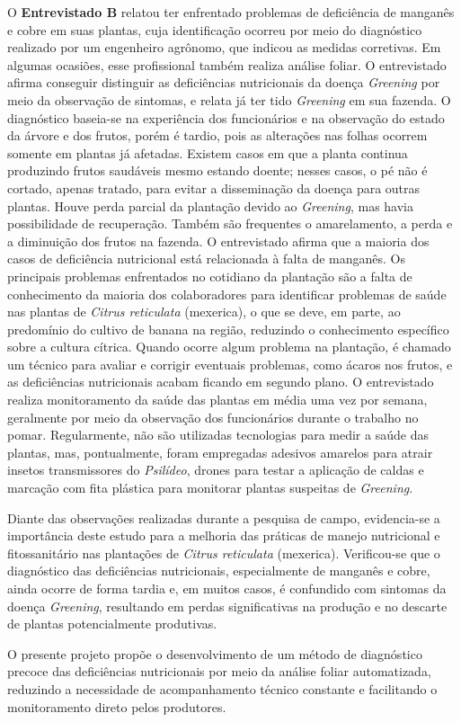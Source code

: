 O \textbf{Entrevistado B} relatou ter enfrentado problemas de deficiência de manganês e cobre 
em suas plantas, cuja identificação ocorreu por meio do diagnóstico realizado por um 
engenheiro agrônomo, que indicou as medidas corretivas. Em algumas ocasiões, esse profissional 
também realiza análise foliar. O entrevistado afirma conseguir distinguir as deficiências 
nutricionais da doença \textit{Greening} por meio da observação de sintomas, e relata já ter 
tido \textit{Greening} em sua fazenda. O diagnóstico baseia-se na experiência dos funcionários 
e na observação do estado da árvore e dos frutos, porém é tardio, pois as alterações nas 
folhas ocorrem somente em plantas já afetadas. Existem casos em que a planta continua 
produzindo frutos saudáveis mesmo estando doente; nesses casos, o pé não é cortado, apenas 
tratado, para evitar a disseminação da doença para outras plantas. Houve perda parcial da 
plantação devido ao \textit{Greening}, mas havia possibilidade de recuperação. 
Também são frequentes o amarelamento, a perda e a diminuição dos frutos na fazenda. 
O entrevistado afirma que a maioria dos casos de deficiência nutricional está relacionada 
à falta de manganês. Os principais problemas enfrentados no cotidiano da plantação são a 
falta de conhecimento da maioria dos colaboradores para identificar problemas de saúde nas 
plantas de \textit{Citrus reticulata} (mexerica), o que se deve, em parte, ao predomínio do 
cultivo de banana na região, reduzindo o conhecimento específico sobre a cultura cítrica. 
Quando ocorre algum problema na plantação, é chamado um técnico para avaliar e corrigir 
eventuais problemas, como ácaros nos frutos, e as deficiências nutricionais acabam ficando 
em segundo plano. O entrevistado realiza monitoramento da saúde das plantas em média uma vez 
por semana, geralmente por meio da observação dos funcionários durante o trabalho no pomar. 
Regularmente, não são utilizadas tecnologias para medir a saúde das plantas, mas, pontualmente,
foram empregadas adesivos amarelos para atrair insetos transmissores do \textit{Psilídeo}, 
drones para testar a aplicação de caldas e marcação com fita plástica para monitorar plantas 
suspeitas de \textit{Greening}.

\medskip

Diante das observações realizadas durante a pesquisa de campo, evidencia-se a importância deste 
estudo para a melhoria das práticas de manejo nutricional e fitossanitário nas plantações de 
\textit{Citrus reticulata} (mexerica). Verificou-se que o diagnóstico das deficiências 
nutricionais, especialmente de manganês e cobre, ainda ocorre de forma tardia e, em muitos 
casos, é confundido com sintomas da doença \textit{Greening}, resultando em perdas significativas
na produção e no descarte de plantas potencialmente produtivas.

\medskip

O presente projeto propõe o desenvolvimento de um método de diagnóstico precoce das 
deficiências nutricionais por meio da análise foliar automatizada, reduzindo a necessidade 
de acompanhamento técnico constante e facilitando o monitoramento direto pelos produtores.

\medskip


